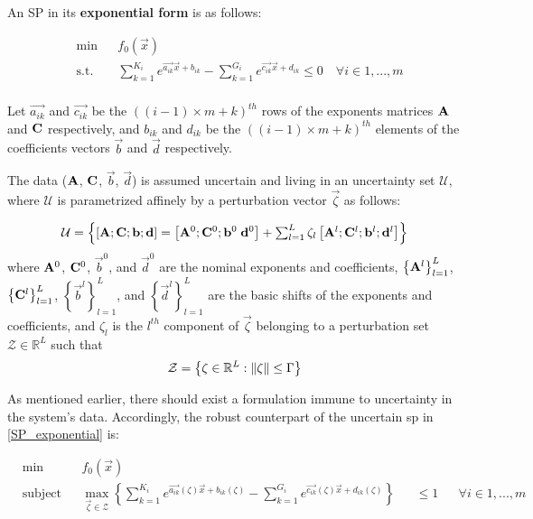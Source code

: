 An SP in its \textbf{exponential form} is as follows:

\begin{equation}
    \label{SP_exponential}
\begin{aligned}
	& \min && f_0\left(\vec{x}\right) \\
	& \text{s.t.} && \textstyle{\sum}_{k=1}^{K_i}e^{\vec{a_{ik}}\vec{x} + b_{ik}} - \textstyle{\sum}_{k=1}^{G_i}e^{\vec{c_{ik}}\vec{x} + d_{ik}} \leq 0 \quad \forall i \in 1,...,m\\
\end{aligned}
\end{equation}

Let $\vec{a_{ik}}$ and $\vec{c_{ik}}$ be the $((i-1)\times m + k)^{th}$ rows of the exponents matrices $\mathbf{A}$ and $\mathbf{C}$ respectively, and $b_{ik}$ and $d_{ik}$ be the $((i-1)\times m + k)^{th}$ elements of the coefficients vectors $\vec{b}$ and $\vec{d}$ respectively.

The data ($\mathbf{A}$, $\mathbf{C}$, $\vec{b}$, $\vec{d}$) is assumed uncertain and living in an uncertainty set $\mathcal{U}$, where $\mathcal{U}$ is parametrized affinely by a perturbation vector $\vec{\zeta}$ as follows:

\begin{equation}
\mathcal{U} = \left\{\left[\mathbf{A};\mathbf{C};\mathbf{b};\mathbf{d}\right] = \left[\mathbf{A}^0;\mathbf{C}^0;\mathbf{b}^0\;\mathbf{d}^0 \right] + \textstyle{\sum_{l=1}^{L}\zeta_l\left[\mathbf{A}^l;\mathbf{C}^l;\mathbf{b}^l; \mathbf{d}^l\right]}\right\}
\label{Data}
\end{equation}
where $\mathbf{A}^0$, $\mathbf{C}^0$, $\vec{b}^0$, and $\vec{d}^0$ are the nominal exponents and coefficients, $\left\{\mathbf{A}^l\right\}_{l=1}^{L}$, $\left\{\mathbf{C}^l\right\}_{l=1}^{L}$, $\left\{\vec{b}^l\right\}_{l=1}^{L}$, and $\left\{\vec{d}^l\right\}_{l=1}^{L}$ are the basic shifts of the exponents and coefficients, and $\zeta_l$ is the $l^{th}$ component of $\vec{\zeta}$ belonging to a perturbation set $\mathcal{Z} \in \mathbb{R}^L$ such that
\begin{equation}
\mathcal{Z} = \left\{ \mathbf{\zeta} \in \mathbb{R}^L: \left\lVert\mathbf{\zeta}\right\rVert \leq \Gamma \right\}
\label{perturbation_set}
\end{equation}

As mentioned earlier, there should exist a formulation immune to
uncertainty in the system's data. Accordingly, the robust counterpart
of the uncertain \gls{sp} in \eqref{SP_exponential} is:

\begin{equation}
\begin{aligned}
& \min &&f_0\left(\vec{x}\right)\\
& \text{subject to} &&\max_{\vec{\zeta} \in \mathcal{Z}} \left\{\textstyle{\sum}_{k=1}^{K_i}e^{\vec{a_{ik}}\left(\zeta\right)\vec{x} + b_{ik}\left(\zeta\right)} - \textstyle{\sum}_{k=1}^{G_i}e^{\vec{c_{ik}}\left(\zeta\right)\vec{x} + d_{ik}\left(\zeta\right)}\right\} &&\leq 1 &&\forall i \in 1,...,m\\
\end{aligned}
\label{SP_counterparts_finite}
\end{equation}

